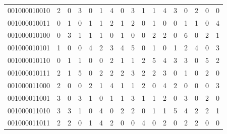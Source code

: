 \documentclass[10pt,a4paper]{article}
\begin{document}
\begin{longtable}{ |c|c|c|c|c|c|c|c|c|c|c|c|c|c|c|c|c| }
    001000010010              & 2                            & 0                                & 3                            & 0                              & 1   & 4   & 0   & 3   & 1   & 1   & 4   & 3   & 0   & 2   & 0   & 0   \\
    001000010011              & 0                            & 1                                & 0                            & 1                              & 1   & 2   & 1   & 2   & 0   & 1   & 0   & 0   & 1   & 1   & 0   & 4   \\
    001000010100              & 0                            & 3                                & 1                            & 1                              & 1   & 0   & 1   & 0   & 0   & 2   & 2   & 0   & 6   & 0   & 2   & 1   \\
    001000010101              & 1                            & 0                                & 0                            & 4                              & 2   & 3   & 4   & 5   & 0   & 1   & 0   & 1   & 2   & 4   & 0   & 3   \\
    001000010110              & 0                            & 1                                & 1                            & 0                              & 0   & 2   & 1   & 1   & 2   & 5   & 4   & 3   & 3   & 0   & 5   & 2   \\
    001000010111              & 2                            & 1                                & 5                            & 0                              & 2   & 2   & 2   & 3   & 2   & 2   & 3   & 0   & 1   & 0   & 2   & 0   \\
    001000011000              & 2                            & 0                                & 0                            & 2                              & 1   & 4   & 1   & 1   & 2   & 0   & 4   & 2   & 0   & 0   & 0   & 3   \\
    001000011001              & 3                            & 0                                & 3                            & 1                              & 0   & 1   & 1   & 3   & 1   & 1   & 2   & 0   & 3   & 0   & 2   & 0   \\
    001000011010              & 3                            & 3                                & 1                            & 0                              & 4   & 0   & 2   & 2   & 0   & 1   & 1   & 5   & 4   & 2   & 2   & 1   \\
    001000011011              & 2                            & 2                                & 0                            & 1                              & 4   & 2   & 0   & 0   & 4   & 0   & 2   & 0   & 2   & 2   & 0   & 0   \\

\end{longtable}
\end{document}
